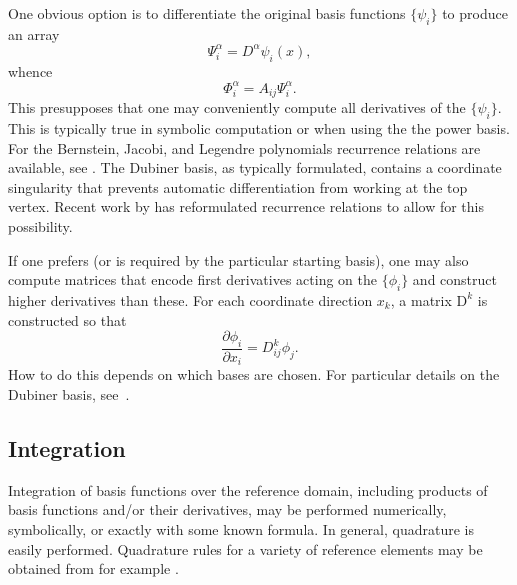 One obvious option is to differentiate the
original basis functions \( \{ \psi_i \} \) to produce an array
\begin{equation}
\Psi^\alpha_i = D^\alpha \psi_i(x),
\end{equation}
whence
\begin{equation}
\Phi^\alpha_i = A_{ij} \Psi^\alpha_i.
\end{equation}
This presupposes that one may conveniently compute all derivatives of
the \( \{ \psi_i \} \).  This is typically true in symbolic
computation or when using the the power basis.  
For the Bernstein, Jacobi, and Legendre
 polynomials recurrence relations are
available, see \citep{KarniadakisSherwin2005,Kirby2010}.  
The Dubiner basis, as typically formulated, contains a coordinate
singularity that prevents automatic differentiation from working at
the top vertex.  Recent work by \citet{Kirby} has reformulated recurrence
relations to allow for this possibility.

If one prefers (or is required by the particular starting basis), one
may also compute matrices that encode first derivatives acting on the
\( \{ \phi_i \} \) and construct higher derivatives than these.
For each coordinate direction \( x_k \), a matrix \( \mathrm{D}^k \)
is constructed so that
\begin{equation}
\frac{\partial \phi_i}{\partial x_i} =
D^k_{ij} \phi_j.
\end{equation}
How to do this depends on which bases are chosen.  For particular
details on the Dubiner basis, see~\citep{Dubiner1991}.  

\subsection{Integration}
Integration of basis functions over the reference domain, including products of
basis functions and/or their derivatives, may be performed numerically,
symbolically, or exactly with some known formula. 
In general, quadrature is easily performed. 
Quadrature rules for a variety of reference elements may 
be obtained from for example \citep{Dunavant1985,KeeganRidzalBochev2008,SolinSegethDolevzel2004}.

